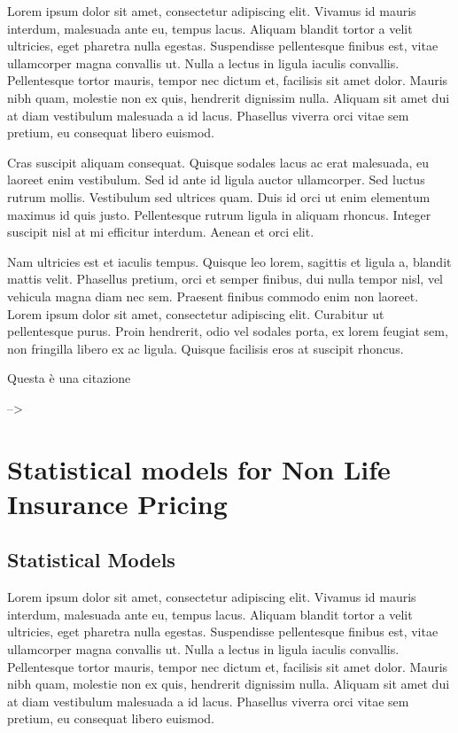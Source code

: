 \documentclass[a4paper, nobind]{templates/ociamthesis}
\theoremstyle{definition}
\theoremstyle{definition}
\theoremstyle{definition}
\theoremstyle{remark}
\begin{document}
Lorem ipsum dolor sit amet, consectetur adipiscing elit. Vivamus id mauris interdum, malesuada ante eu, tempus lacus. Aliquam blandit tortor a velit ultricies, eget pharetra nulla egestas. Suspendisse pellentesque finibus est, vitae ullamcorper magna convallis ut. Nulla a lectus in ligula iaculis convallis. Pellentesque tortor mauris, tempor nec dictum et, facilisis sit amet dolor. Mauris nibh quam, molestie non ex quis, hendrerit dignissim nulla. Aliquam sit amet dui at diam vestibulum malesuada a id lacus. Phasellus viverra orci vitae sem pretium, eu consequat libero euismod.

Cras suscipit aliquam consequat. Quisque sodales lacus ac erat malesuada, eu laoreet enim vestibulum. Sed id ante id ligula auctor ullamcorper. Sed luctus rutrum mollis. Vestibulum sed ultrices quam. Duis id orci ut enim elementum maximus id quis justo. Pellentesque rutrum ligula in aliquam rhoncus. Integer suscipit nisl at mi efficitur interdum. Aenean et orci elit.

Nam ultricies est et iaculis tempus. Quisque leo lorem, sagittis et ligula a, blandit mattis velit. Phasellus pretium, orci et semper finibus, dui nulla tempor nisl, vel vehicula magna diam nec sem. Praesent finibus commodo enim non laoreet. Lorem ipsum dolor sit amet, consectetur adipiscing elit. Curabitur ut pellentesque purus. Proin hendrerit, odio vel sodales porta, ex lorem feugiat sem, non fringilla libero ex ac ligula. Quisque facilisis eros at suscipit rhoncus.

Questa è una citazione \autocite{Shea2014,Lottridge2012}

--\textgreater{}

\hypertarget{chap:models}{%
\chapter{\texorpdfstring{\textbf{Statistical models for Non Life Insurance Pricing}}{Statistical models for Non Life Insurance Pricing}}\label{chap:models}}

\minitoc  


\hypertarget{statistical-models}{%
\section{Statistical Models}\label{statistical-models}}

Lorem ipsum dolor sit amet, consectetur adipiscing elit. Vivamus id mauris interdum, malesuada ante eu, tempus lacus. Aliquam blandit tortor a velit ultricies, eget pharetra nulla egestas. Suspendisse pellentesque finibus est, vitae ullamcorper magna convallis ut. Nulla a lectus in ligula iaculis convallis. Pellentesque tortor mauris, tempor nec dictum et, facilisis sit amet dolor. Mauris nibh quam, molestie non ex quis, hendrerit dignissim nulla. Aliquam sit amet dui at diam vestibulum malesuada a id lacus. Phasellus viverra orci vitae sem pretium, eu consequat libero euismod.
\end{document}
